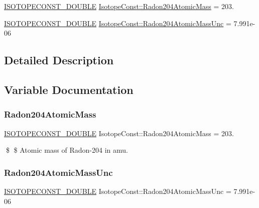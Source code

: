 \begin{DoxyCompactItemize}
\item 
\mbox{\hyperlink{group___isotope_const-_macros_ga8f45a7272ce02c0b4c65c44636ed719a}{I\+S\+O\+T\+O\+P\+E\+C\+O\+N\+S\+T\+\_\+\+D\+O\+U\+B\+LE}} \mbox{\hyperlink{group___isotope_const-_radon-_rn204_ga7e7ad0efcf3e60adac83e683fbf5c852}{Isotope\+Const\+::\+Radon204\+Atomic\+Mass}} = 203.
\item 
\mbox{\hyperlink{group___isotope_const-_macros_ga8f45a7272ce02c0b4c65c44636ed719a}{I\+S\+O\+T\+O\+P\+E\+C\+O\+N\+S\+T\+\_\+\+D\+O\+U\+B\+LE}} \mbox{\hyperlink{group___isotope_const-_radon-_rn204_ga3cdbb24b26ce0f06a1a9a6edf02e9894}{Isotope\+Const\+::\+Radon204\+Atomic\+Mass\+Unc}} = 7.\+991e-\/06
\end{DoxyCompactItemize}


\subsection{Detailed Description}


\subsection{Variable Documentation}
\mbox{\label{group___isotope_const-_radon-_rn204_ga7e7ad0efcf3e60adac83e683fbf5c852}} 
\subsubsection{\texorpdfstring{Radon204\+Atomic\+Mass}{Radon204AtomicMass}}
{\footnotesize\ttfamily \mbox{\hyperlink{group___isotope_const-_macros_ga8f45a7272ce02c0b4c65c44636ed719a}{I\+S\+O\+T\+O\+P\+E\+C\+O\+N\+S\+T\+\_\+\+D\+O\+U\+B\+LE}} Isotope\+Const\+::\+Radon204\+Atomic\+Mass = 203.}

\$ \$ Atomic mass of Radon-\/204 in amu. \mbox{\label{group___isotope_const-_radon-_rn204_ga3cdbb24b26ce0f06a1a9a6edf02e9894}} 
\subsubsection{\texorpdfstring{Radon204\+Atomic\+Mass\+Unc}{Radon204AtomicMassUnc}}
{\footnotesize\ttfamily \mbox{\hyperlink{group___isotope_const-_macros_ga8f45a7272ce02c0b4c65c44636ed719a}{I\+S\+O\+T\+O\+P\+E\+C\+O\+N\+S\+T\+\_\+\+D\+O\+U\+B\+LE}} Isotope\+Const\+::\+Radon204\+Atomic\+Mass\+Unc = 7.\+991e-\/06}


